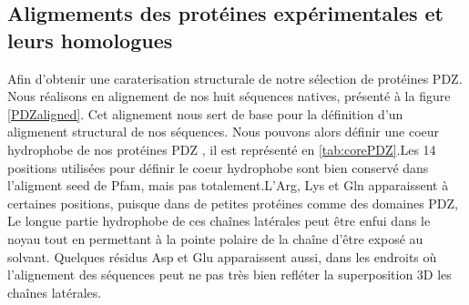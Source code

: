 \subsection{Aligmements des protéines expérimentales et leurs homologues}



Afin d'obtenir une caraterisation structurale de notre sélection de protéines PDZ. Nous réalisons en alignement de nos huit séquences natives, présenté à la figure \ref{PDZaligned}. Cet alignement nous sert de base pour la définition d'un aligmenent structural de nos séquences. Nous pouvons alors définir une coeur hydrophobe de  nos protéines \og PDZ \fg , il est représenté en \ref{tab:corePDZ}.Les 14 positions utilisées pour définir le coeur hydrophobe sont bien conservé dans l'aligment \og seed \fg de Pfam, mais pas totalement.L'Arg, Lys et Gln apparaissent à certaines positions, puisque dans de petites protéines comme des domaines PDZ, Le longue partie hydrophobe  de ces chaînes latérales peut être enfui dans le noyau tout en permettant à la pointe polaire de la chaîne d'être exposé au solvant. Quelques résidus  Asp et Glu apparaissent aussi, dans les endroits où l'alignement des séquences peut ne pas très bien refléter la superposition 3D les chaînes latérales.

    

